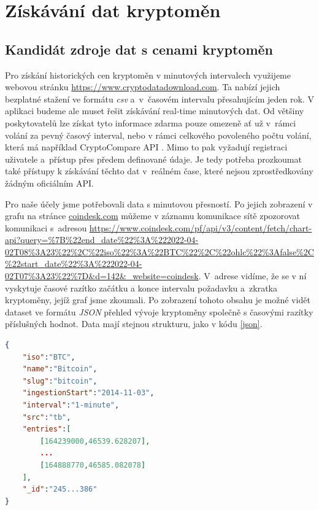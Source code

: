 \newpage

\section{Získávání dat kryptoměn}

\subsection{Kandidát zdroje dat s cenami kryptoměn}

Pro získání historických cen kryptoměn v minutových intervalech využijeme webovou stránku \url{https://www.cryptodatadownload.com}.
Ta nabízí jejich bezplatné stažení ve formátu \textit{csv} a~v~časovém intervalu přesahujícím jeden rok. 
V aplikaci budeme ale muset řešit získávání real-time minutových dat. 
Od většiny poskytovatelů lze získat tyto informace zdarma pouze omezeně ať už v~rámci volání za pevný časový interval, nebo v rámci celkového povoleného počtu volání, která má například CryptoCompare API \cite{cryptocompare}.
Mimo to pak vyžadují registraci uživatele a~přístup přes předem definované údaje. 
Je tedy potřeba prozkoumat také přístupy k získávání těchto dat v~reálném čase, které nejsou zprostředkovány žádným oficiálním API. 

Pro naše účely jsme potřebovali data s minutovou přesností.
Po jejich zobrazení v grafu na stránce \url{coindesk.com} můžeme v záznamu komunikace sítě zpozorovat komunikaci s~adresou
\url{https://www.coindesk.com/pf/api/v3/content/fetch/chart-api?query=%7B%22end_date%22%3A%222022-04-02T08%3A23%22%2C%22iso%22%3A%22BTC%22%2C%22ohlc%22%3Afalse%2C%22start_date%22%3A%222022-04-02T07%3A23%22%7D&d=142&_website=coindesk}.
V~adrese vidíme, že se v ní vyskytuje časové razítko začátku a konce intervalu požadavku a~zkratka kryptoměny, jejíž graf jsme zkoumali. 
Po zobrazení tohoto obsahu je možné vidět dataset ve formátu \textit{JSON} přehled vývoje kryptoměny společně s časovými razítky příslušných hodnot. 
Data mají stejnou strukturu, jako v kódu \ref{json}.

\begin{lstlisting}[caption={~Formát datasetu s historickými hodnotami kryptoměn},label=json,language=json,firstnumber=1]
{
    "iso":"BTC",
    "name":"Bitcoin",
    "slug":"bitcoin",
    "ingestionStart":"2014-11-03",
    "interval":"1-minute",
    "src":"tb",
    "entries":[
        [164239000,46539.628207],
        ...
        [164888770,46585.082078]
    ],
    "_id":"245...386"
}
\end{lstlisting}

